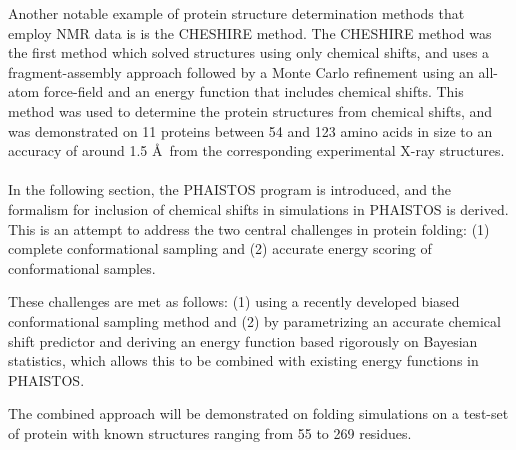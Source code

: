 Another notable example of protein structure determination methods that employ NMR data is is the CHESHIRE method\cite{cheshire}.
The CHESHIRE method was the first method which solved structures using only chemical shifts, and uses a fragment-assembly approach followed by a Monte Carlo refinement using an all-atom force-field and an energy function that includes chemical shifts.
This method was used to determine the protein structures from chemical shifts, and was demonstrated on 11 proteins between 54 and 123 amino acids in size to an accuracy of around 1.5 \AA~from the corresponding experimental X-ray structures.
\\\\
In the following section, the PHAISTOS program is introduced, and the formalism for inclusion of chemical shifts in simulations in PHAISTOS is derived.
This is an attempt to address the two central challenges in protein folding: (1) complete conformational sampling and (2) accurate energy scoring of conformational samples.

These challenges are met as follows: (1) using a recently developed biased conformational sampling method and (2) by parametrizing an accurate chemical shift predictor and deriving an energy function based rigorously on Bayesian statistics, which allows this to be combined with existing energy functions in PHAISTOS.

The combined approach will be demonstrated on folding simulations on a test-set of protein with known structures ranging from 55 to 269 residues.

